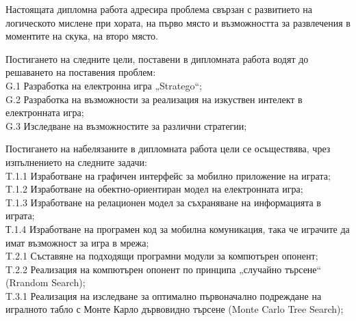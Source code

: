 Настоящата дипломна работа адресира проблема свързан с развитието на логическото мислене при хората, на първо място и възможността за развлечения в моментите на скука, на второ място. 

Постигането на следните цели, поставени в дипломната работа водят до решаването на поставения проблем: \\
G.1 Разработка на електронна игра „Stratego“; \\
G.2 Разработка на възможности за реализация на изкуствен интелект в електронната игра; \\
G.3 Изследване на възможностите за различни стратегии;

Постигането на набелязаните в дипломната работа цели се осъществява, чрез изпълнението на следните задачи: \\
T.1.1 Изработване на графичен интерфейс за мобилно приложение на играта; \\
T.1.2 Изработване на обектно-ориентиран модел на електронната игра; \\
T.1.3 Изработване на релационен модел за съхраняване на информацията в играта; \\
Т.1.4 Изработване на програмен код за мобилна комуникация, така че играчите да имат възможност за игра в мрежа; \\
T.2.1 Съставяне на подходящи програмни модули за компютърен опонент; \\
T.2.2 Реализация на компютърен опонент по принципа „случайно търсене“ (Rrandom Search); \\
T.3.1 Реализация на изследване за оптимално първоначално подреждане на игралното табло с Монте Карло дървовидно търсене (Monte Carlo Tree Search); \\

